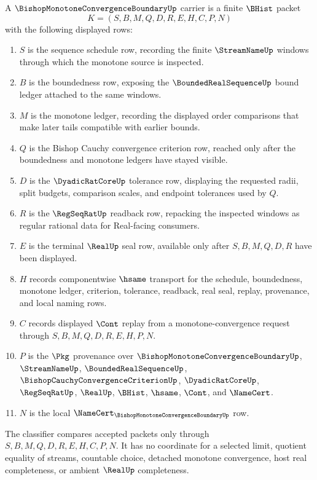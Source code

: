 \begin{definition}
\label{def:bishop-monotone-convergence-boundary-carrier}
A $\BishopMonotoneConvergenceBoundaryUp$ carrier is a finite $\BHist$ packet
$$
K=(S,B,M,Q,D,R,E,H,C,P,N)
$$
with the following displayed rows:
\begin{enumerate}
\item $S$ is the sequence schedule row, recording the finite $\StreamNameUp$ windows through which the monotone source is inspected.
\item $B$ is the boundedness row, exposing the $\BoundedRealSequenceUp$ bound ledger attached to the same windows.
\item $M$ is the monotone ledger, recording the displayed order comparisons that make later tails compatible with earlier bounds.
\item $Q$ is the Bishop Cauchy convergence criterion row, reached only after the boundedness and monotone ledgers have stayed visible.
\item $D$ is the $\DyadicRatCoreUp$ tolerance row, displaying the requested radii, split budgets, comparison scales, and endpoint tolerances used by $Q$.
\item $R$ is the $\RegSeqRatUp$ readback row, repacking the inspected windows as regular rational data for Real-facing consumers.
\item $E$ is the terminal $\RealUp$ seal row, available only after $S,B,M,Q,D,R$ have been displayed.
\item $H$ records componentwise $\hsame$ transport for the schedule, boundedness, monotone ledger, criterion, tolerance, readback, real seal, replay, provenance, and local naming rows.
\item $C$ records displayed $\Cont$ replay from a monotone-convergence request through $S,B,M,Q,D,R,E,H,P,N$.
\item $P$ is the $\Pkg$ provenance over $\BishopMonotoneConvergenceBoundaryUp$, $\StreamNameUp$, $\BoundedRealSequenceUp$, $\BishopCauchyConvergenceCriterionUp$, $\DyadicRatCoreUp$, $\RegSeqRatUp$, $\RealUp$, $\BHist$, $\hsame$, $\Cont$, and $\NameCert$.
\item $N$ is the local $\NameCert_{\BishopMonotoneConvergenceBoundaryUp}$ row.
\end{enumerate}
The classifier compares accepted packets only through $S,B,M,Q,D,R,E,H,C,P,N$. It has no coordinate for a selected limit, quotient equality of streams, countable choice, detached monotone convergence, host real completeness, or ambient $\RealUp$ completeness.
\end{definition}

